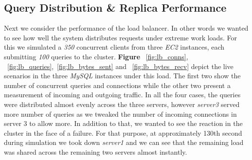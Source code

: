 \documentclass[12pt]{article}
\begin{document}
\subsection{Query Distribution \& Replica Performance} Next we
consider the performance of the load balancer. In other words we wanted to see
how well the system distributes requests under extreme work loads. For this we
simulated a \emph{350} concurrent clients from three \emph{EC2} instances, each
submitting \emph{100} queries to the cluster. \textbf{Figure
}~\ref{fig:lb_conns}, ~\ref{fig:lb_queries},~\ref{fig:lb_bytes_sent} and
~\ref{fig:lb_bytes_recv} depict the live scenarios in the three \emph{MySQL}
instances under this load. The first two show the number of concurrent queries
and connections while the other two present a measurement of incoming and
outgoing traffic. In all the four cases, the queries were distributed almost
evenly across the three servers, however \emph{server3} served more number of queries
as we tweaked the number of incoming connections in server 3 to allow more. In
addition to that, we wanted to see the reaction in the cluster in the face of a
failure. For that purpose, at approximately 130th second during simulation we
took down \emph{server1} and we can see that the remaining load was shared across the
remaining two servers almost instantly.  
\end{document}
